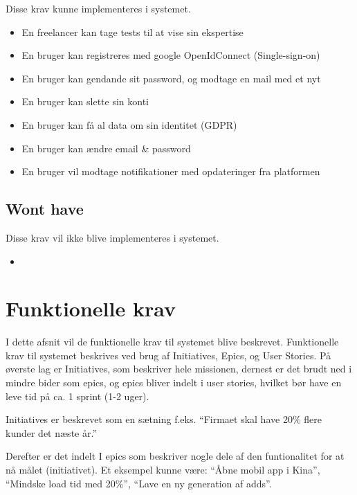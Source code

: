 Disse krav kunne implementeres i systemet.

\begin{itemize}
    \item En freelancer kan tage tests til at vise sin ekspertise
    \item En bruger kan registreres med google OpenIdConnect (Single-sign-on)
    \item En bruger kan gendande sit password, og modtage en mail med et nyt
    \item En bruger kan slette sin konti
    \item En bruger kan få al data om sin identitet (GDPR)
    \item En bruger kan ændre email \& password
    \item En bruger vil modtage notifikationer med opdateringer fra platformen
\end{itemize}

\subsection{Wont have}

Disse krav vil ikke blive implementeres i systemet.

\begin{itemize}
    \item
\end{itemize}

\section{Funktionelle krav}

I dette afsnit vil de funktionelle krav til systemet blive beskrevet. Funktionelle krav til systemet beskrives ved brug af Initiatives, Epics, og User Stories. På øverste lag er Initiatives, som beskriver hele missionen, dernest er det brudt ned i mindre bider som epics, og epics bliver indelt i user stories, hvilket bør have en leve tid på ca. 1 sprint (1-2 uger).

Initiatives er beskrevet som en sætning f.eks.  ``Firmaet skal have 20\% flere kunder det næste år.''

Derefter er det indelt I epics som beskriver nogle dele af den funtionalitet for at nå målet (initiativet). Et eksempel kunne være: ``Åbne mobil app i Kina'', ``Mindske load tid med 20\%'', ``Lave en ny generation af adds''.

